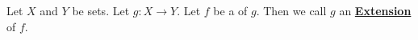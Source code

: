 \newcommand{\Extension}[0]{\textbf{\hyperref[def:FunctionExtension]{Extension}}\xspace}
\newcommand{\Extensions}[0]{\textbf{\hyperref[def:FunctionExtension]{Extensions}}\xspace}
\begin{df}[Extension]
\label{def:FunctionExtension}

\rm
    Let $X$ and $Y$ be sets.
	Let $g:X \to Y$. 
	Let $f$ be a \Restriction of $g$.  
    Then we call $g$ an 
    \Extension of $f$. 
\end{df}

